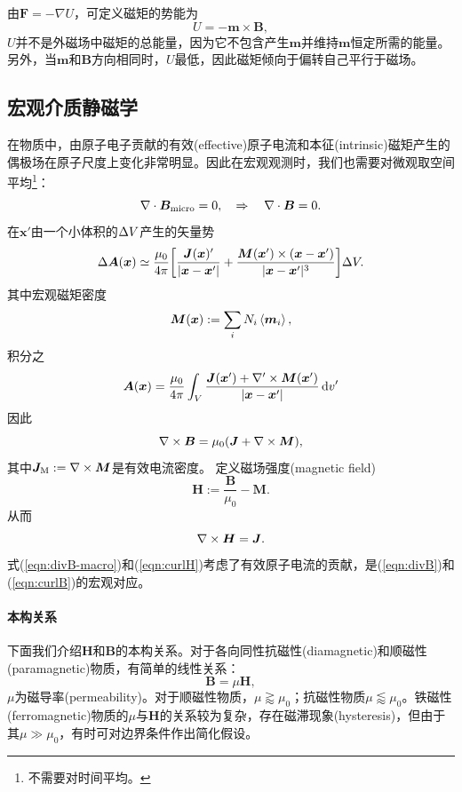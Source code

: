由$\bm F=-\nabla U$，可定义磁矩的势能为
\[
    U=-\bm m\times\bm B,
\]
$U$并不是外磁场中磁矩的总能量，因为它不包含产生$\bm m$并维持$\bm m$恒定所需的能量。另外，当$\bm m$和$\bm B$方向相同时，$U$最低，因此磁矩倾向于偏转自己平行于磁场。
\subsection{宏观介质静磁学}
在物质中，由原子电子贡献的有效(effective)原子电流和本征(intrinsic)磁矩产生的偶极场在原子尺度上变化非常明显。因此在宏观观测时，我们也需要对微观取空间平均\footnote{不需要对时间平均。}：
\begin{equation}
    \label{eqn:divB-macro}
    \nabla\cdot\bm B_\text{micro}=0,\quad\Rightarrow\quad\nabla\cdot\bm B=0.
\end{equation}
在$\bm x'$由一个小体积的$\Delta V$产生的矢量势
\[
    \Delta\bm A(\bm x)\simeq\frac{\mu_0}{4\pi}\biggl[\frac{\bm J(\bm x)'}{|\bm x-\bm x'|}+\frac{\bm M(\bm x')\times(\bm x-\bm x')}{|\bm x-\bm x'|^3}\biggr]\Delta V.
\]
其中宏观磁矩密度
\[
    \bm M(\bm x):=\sum_iN_i\left\langle \bm m_i\right\rangle,
\]
积分之
\[
    \bm A(\bm x)=\frac{\mu_0}{4\pi}\int_V\frac{\bm J(\bm x')+\nabla'\times\bm M(\bm x')}{|\bm x-\bm x'|}\mathop{}\!\mathrm{d} v'
\]
因此 
\[
    \nabla\times\bm B=\mu_0(\bm J+\nabla\times\bm M),
\]
其中$\bm J_\text M:=\nabla\times\bm M$是有效电流密度。
定义磁场强度(magnetic field)
\begin{equation}
    \bm H:=\frac{\bm B}{\mu_0}-\bm M.
\end{equation}
从而 
\begin{equation}
    \label{eqn:curlH}
    \nabla\times\bm H=\bm J.
\end{equation}
式(\ref{eqn:divB-macro})和(\ref{eqn:curlH})考虑了有效原子电流的贡献，是(\ref{eqn:divB})和(\ref{eqn:curlB})的宏观对应。
\paragraph{本构关系}
下面我们介绍$\bm H$和$\bm B$的本构关系。对于各向同性抗磁性(diamagnetic)和顺磁性(paramagnetic)物质，有简单的线性关系：
\[
    \bm B=\mu\bm H,
\]
$\mu$为磁导率(permeability)。对于顺磁性物质，$\mu\gtrapprox\mu_0$；抗磁性物质$\mu\lessapprox\mu_0$。铁磁性(ferromagnetic)物质的$\mu$与$\bm H$的关系较为复杂，存在磁滞现象(hysteresis)，但由于其$\mu\gg\mu_0$，有时可对边界条件作出简化假设。
